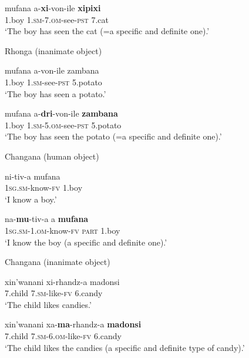 \documentclass[output=paper]{langsci/langscibook}
\begin{document}
\ea
\gll mufana        a-\textbf{xi}{}-von-ile                   \textbf{xipixi}\\
     1.boy           \textsc{1.sm-7.om}{}-see-\textsc{pst}       7.cat\\
\glt ‘The boy has seen the cat (=a specific and definite one).’
\z


{Rhonga (inanimate object)}

\ea
\gll mufana       a-von-ile                      zambana\\
     1.boy          1.\textsc{sm}{}-see-\textsc{pst}                5.potato\\
\glt ‘The boy has seen a potato.’
\z

\ea
\gll mufana        a-\textbf{dri}{}-von-ile                \textbf{zambana}\\
     1.boy           1.\textsc{sm-5.om}{}-see-\textsc{pst}      5.potato\\
\glt ‘The boy has seen the potato (=a specific and definite one).’
\z


{Changana (human object)}

\ea
\gll ni-tiv-a                           mufana\\
     \textsc{1sg.sm}{}-know-\textsc{fv}           1.boy\\
\glt ‘I know a boy.’
\z

\ea
\gll na-\textbf{mu}{}-tiv-a                            a{\rmfnm}       \textbf{mufana}\\
     \textsc{1sg.sm-1.om}{}-know-\textsc{fv}          \textsc{part}    1.boy\\
\glt ‘I know the boy (a specific and definite one).’
\z


{Changana (inanimate object)}

\ea
\gll xin’wanani        xi-rhandz-a        madonsi\\
     7.child              \textsc{7.sm}{}-like-\textsc{fv}       6.candy\\
\glt ‘The child likes candies.’
\z

\ea
\gll xin’wanani       xa-\textbf{ma}{}-rhandz-a         \textbf{madonsi}\\
     7.child              \textsc{7.sm-6.om}{}-like-\textsc{fv}     6.candy\\
\glt ‘The child likes the candies (a specific and definite type of candy).’
\z
\end{document}
